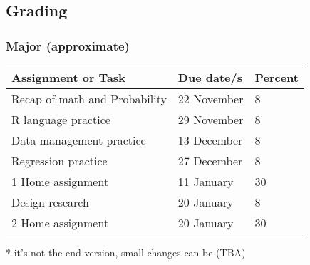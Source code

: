 \documentclass[t, 11pt]{beamer}
\begin{document}
	\subsection{Grading}

\begin{frame}\label{}
	\frametitle{\insertsection}
	\frametitle{Major  (approximate)}
\begin{table}[]
	\begin{threeparttable}
	\begin{tabular}{@{}lll@{}}
		\toprule
		\textbf{Assignment or Task}   & \textbf{Due date/s} & \textbf{Percent} \\ \midrule
		Recap of math and Probability & 22 November         & 8       \\
		R language practice           & 29 November         & 8      \\
		Data management practice      & 13 December         & 8                \\
		Regression practice           & 27 December         & 8                \\
		1 Home assignment             & 11 January          & 30               \\
		Design research               & 20 January          & 8                \\
		2 Home assignment             & 20 January          & 30               \\ \bottomrule
	\end{tabular}
	\begin{tablenotes}\footnotesize
		\item[*]  it's not the end version, small changes can be (TBA)
	\end{tablenotes}
	\end{threeparttable}
\end{table}
\end{frame}
\end{document}
